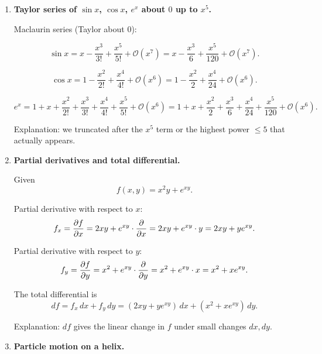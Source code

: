 \documentclass[../main.tex]{subfiles}
\begin{document}
\begin{enumerate}
Now compute the function values:
\begin{align*}
f(1) &= 1^3 -6(1)^2 + 9(1) +1
= 1 -6 +9 +1
= 5, \\
f(3) &= 3^3 -6(3)^2 + 9(3) +1
= 27 -54 +27 +1
= 1.
\end{align*}

Conclusion:
\[
  \text{local maximum: } f(1)=5 \text{ at } x=1,
  \qquad
  \text{local minimum: } f(3)=1 \text{ at } x=3.
\]

Explanation: the sign of $f''$ at the critical point determines if the point is a max ($f''<0$) or a min ($f''>0$).


\item \textbf{Taylor series of $\sin x$, $\cos x$, $e^x$ about $0$ up to $x^5$.}

Maclaurin series (Taylor about $0$):

\[
\sin x = x - \frac{x^3}{3!} + \frac{x^5}{5!} + \mathcal{O}(x^7)
= x - \frac{x^3}{6} + \frac{x^5}{120} + \mathcal{O}(x^7).
\]

\[
\cos x = 1 - \frac{x^2}{2!} + \frac{x^4}{4!} + \mathcal{O}(x^6)
= 1 - \frac{x^2}{2} + \frac{x^4}{24} + \mathcal{O}(x^6).
\]

\[
e^x = 1 + x + \frac{x^2}{2!} + \frac{x^3}{3!} + \frac{x^4}{4!} + \frac{x^5}{5!} + \mathcal{O}(x^6)
= 1 + x + \frac{x^2}{2} + \frac{x^3}{6} + \frac{x^4}{24} + \frac{x^5}{120} + \mathcal{O}(x^6).
\]

Explanation: we truncated after the $x^5$ term or the highest power $\le 5$ that actually appears.


\item \textbf{Partial derivatives and total differential.}

Given
\[
  f(x,y) = x^2 y + e^{xy}.
\]

Partial derivative with respect to $x$:
\[
  f_x = \pdv{f}{x}
  = 2x y + e^{xy} \cdot \pdv{}{x}(xy)
  = 2xy + e^{xy} \cdot y
  = 2xy + y e^{xy}.
\]

Partial derivative with respect to $y$:
\[
  f_y = \pdv{f}{y}
  = x^2 + e^{xy} \cdot \pdv{}{y}(xy)
  = x^2 + e^{xy} \cdot x
  = x^2 + x e^{xy}.
\]

The total differential is
\[
  df = f_x \, dx + f_y \, dy
  = (2xy + y e^{xy})\,dx + (x^2 + x e^{xy})\,dy.
\]

Explanation: $df$ gives the linear change in $f$ under small changes $dx,dy$.


\item \textbf{Particle motion on a helix.}


\end{enumerate}
\end{document}
